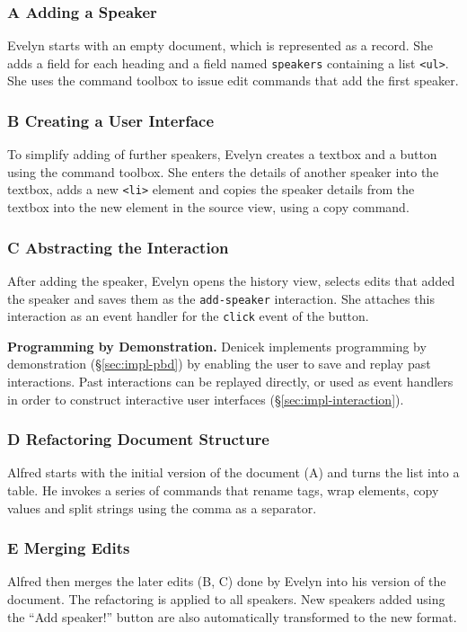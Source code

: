 \documentclass[sigconf]{acmart}
\newcommand{\diff}[1]{{#1}}
\newcommand{\note}[1]{}
\newcommand*\circled[1]
{{\normalfont \Large \textcircled{\footnotesize {#1}}}}
\DeclareRobustCommand{\keyideabox}[3]
{\vspace{\dimexpr\baselineskip\relax} \colorbox{gray!20}{
\parbox{\dimexpr\columnwidth-\marginparsep-10pt\relax}
{\small {#1} \textbf{#2.} #3}
}}
\begin{document}
\subsubsection*{\circled{A} Adding a Speaker}
Evelyn starts with an empty document, which is represented as a record. She adds a field for
each heading and a field named {\small\texttt{speakers}}
containing a list {\small\texttt{<ul>}}. \diff{She
uses the command toolbox to issue edit commands that add the first speaker.}

\subsubsection*{\circled{B} Creating a User Interface} To simplify adding of
further speakers, Evelyn creates a textbox and a button \diff{using the command toolbox}. She enters
the details of another speaker \diff{into the textbox}, adds a new {\small\texttt{<li>}} element
and copies the speaker details from the textbox into the new element in the source view,
\diff{using a copy command}.

\subsubsection*{\circled{C} Abstracting the Interaction} After adding the speaker,
Evelyn opens the history view, selects edits that added the speaker and saves them as the
{\small\texttt{add-speaker}} interaction. She attaches this interaction as an event handler for the
{\small\texttt{click}} event of the button.


\keyideabox{\faLightbulbO}{Programming by Demonstration}{Denicek implements programming by
demonstration (\S\ref{sec:impl-pbd}) by enabling the user to save and replay past interactions.
Past interactions can be replayed directly, or used as event handlers in order to construct interactive user
interfaces (\S\ref{sec:impl-interaction}).}


\subsubsection*{\circled{D} Refactoring Document Structure} Alfred starts with the initial
version of the document (A) and turns the list into a table. He invokes a series of commands that
\diff{rename tags, wrap elements, copy values and split strings using the comma as a separator}.
\note{More concrete description of edits}

\subsubsection*{\circled{E} Merging Edits}
\diff{Alfred then merges the later edits (B, C) done by Evelyn into his version of the document.}
The refactoring is applied to all speakers. New speakers added using the ``Add speaker!''
button are also automatically transformed to the new format.
\end{document}
